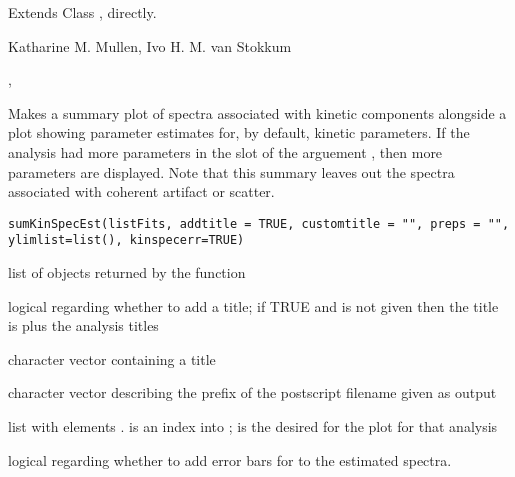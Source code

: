 \documentclass{article}
\begin{document}
\begin{Section}{Extends}
Class , directly.
\end{Section}
\begin{Author}\relax
Katharine M. Mullen, Ivo H. M. van Stokkum
\end{Author}
\begin{SeeAlso}\relax
{}, 
\end{SeeAlso}

\begin{Description}\relax
Makes a summary plot of spectra associated with kinetic components
alongside a plot showing parameter estimates for, by default, kinetic 
parameters.  If the analysis had more parameters in the  slot 
of the arguement , then more parameters are displayed. 
Note that this summary leaves out the spectra associated with coherent 
artifact or scatter.
\end{Description}
\begin{Usage}
\begin{verbatim}
sumKinSpecEst(listFits, addtitle = TRUE, customtitle = "", preps = "", 
ylimlist=list(), kinspecerr=TRUE)
\end{verbatim}
\end{Usage}
\begin{Arguments}
\begin{ldescription}
\item[\code{listFits}] list of objects returned by the  function
\item[\code{addtitle}] logical regarding whether to add a title; if TRUE and
 is not given then the title is  
 plus the analysis titles
\item[\code{customtitle}] character vector containing a title
\item[\code{preps}] character vector describing the prefix of the postscript
filename given as output
\item[\code{ylimlist}] list with elements .   is
an index into ;  is the desired  for
the plot for that analysis
\item[\code{kinspecerr}] logical regarding whether to add error bars for to the 
estimated spectra. 

\end{ldescription}
\end{Arguments}
\end{document}
